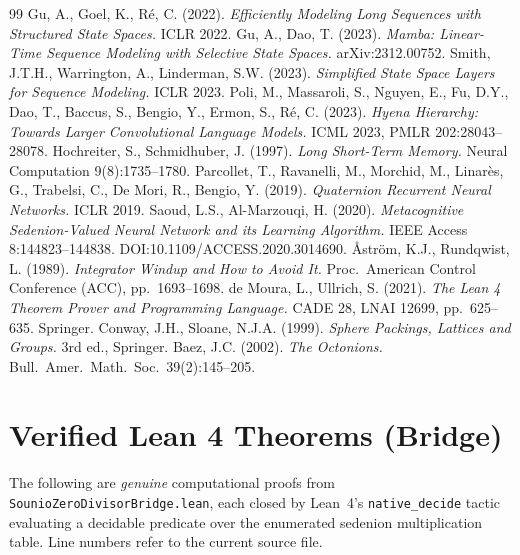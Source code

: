 \documentclass{article}
\begin{document}
\begin{thebibliography}{99}
 Gu, A., Goel, K., R\'e, C. (2022). \textit{Efficiently Modeling Long Sequences with Structured State Spaces.} ICLR 2022.
 Gu, A., Dao, T. (2023). \textit{Mamba: Linear-Time Sequence Modeling with Selective State Spaces.} arXiv:2312.00752.
 Smith, J.T.H., Warrington, A., Linderman, S.W. (2023). \textit{Simplified State Space Layers for Sequence Modeling.} ICLR 2023.
 Poli, M., Massaroli, S., Nguyen, E., Fu, D.Y., Dao, T., Baccus, S., Bengio, Y., Ermon, S., R\'e, C. (2023). \textit{Hyena Hierarchy: Towards Larger Convolutional Language Models.} ICML 2023, PMLR 202:28043--28078.
 Hochreiter, S., Schmidhuber, J. (1997). \textit{Long Short-Term Memory.} Neural Computation 9(8):1735--1780.
 Parcollet, T., Ravanelli, M., Morchid, M., Linar\`es, G., Trabelsi, C., De Mori, R., Bengio, Y. (2019). \textit{Quaternion Recurrent Neural Networks.} ICLR 2019.
 Saoud, L.S., Al-Marzouqi, H. (2020). \textit{Metacognitive Sedenion-Valued Neural Network and its Learning Algorithm.} IEEE Access 8:144823--144838. DOI:10.1109/ACCESS.2020.3014690.
 \AA{}str\"om, K.J., Rundqwist, L. (1989). \textit{Integrator Windup and How to Avoid It.} Proc.\ American Control Conference (ACC), pp.\ 1693--1698.
 de Moura, L., Ullrich, S. (2021). \textit{The Lean 4 Theorem Prover and Programming Language.} CADE 28, LNAI 12699, pp.\ 625--635. Springer.
 Conway, J.H., Sloane, N.J.A. (1999). \textit{Sphere Packings, Lattices and Groups.} 3rd ed., Springer.
 Baez, J.C. (2002). \textit{The Octonions.} Bull.\ Amer.\ Math.\ Soc.\ 39(2):145--205.
\end{thebibliography}

\appendix

\section{Verified Lean 4 Theorems (Bridge)}
\label{app:bridge}

The following are \emph{genuine} computational proofs from
\texttt{SounioZeroDivisorBridge.lean}, each closed by
Lean~4's \texttt{native\_decide} tactic evaluating a decidable predicate
over the enumerated sedenion multiplication table. Line numbers refer to
the current source file.
\end{document}
